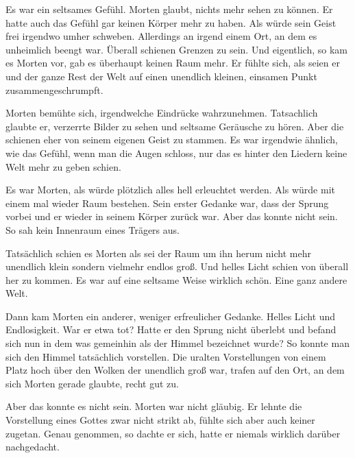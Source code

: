 Es war ein seltsames Gefühl. Morten glaubt, nichts mehr sehen zu können. Er hatte auch das Gefühl gar keinen Körper mehr zu haben. Als würde sein Geist frei irgendwo umher schweben. Allerdings an irgend einem Ort, an dem es unheimlich beengt war. Überall schienen Grenzen zu sein. Und eigentlich, so kam es Morten vor, gab es überhaupt keinen Raum mehr. Er fühlte sich, als seien er und der ganze Rest der Welt auf einen unendlich kleinen, einsamen Punkt zusammengeschrumpft.

\par

Morten bemühte sich, irgendwelche Eindrücke wahrzunehmen. Tatsachlich glaubte er, verzerrte Bilder zu sehen und seltsame Geräusche zu hören. Aber die schienen eher von seinem eigenen Geist zu stammen. Es war irgendwie ähnlich, wie das Gefühl, wenn man die Augen schloss, nur das es hinter den Liedern keine Welt mehr zu geben schien.

\par

Es war Morten, als würde plötzlich alles hell erleuchtet werden. Als würde mit einem mal wieder Raum bestehen. Sein erster Gedanke war, dass der Sprung vorbei und er wieder in seinem Körper zurück war. Aber das konnte nicht sein. So sah kein Innenraum eines Trägers aus.

\par

Tatsächlich schien es Morten als sei der Raum um ihn herum nicht mehr unendlich klein sondern vielmehr endlos groß. Und helles Licht schien von überall her zu kommen. Es war auf eine seltsame Weise wirklich schön. Eine ganz andere Welt.

\par

Dann kam Morten ein anderer, weniger erfreulicher Gedanke. Helles Licht und Endlosigkeit. War er etwa tot? Hatte er den Sprung nicht überlebt und befand sich nun in dem was gemeinhin als der Himmel bezeichnet wurde? So konnte man sich den Himmel tatsächlich vorstellen. Die uralten Vorstellungen von einem Platz hoch über den Wolken der unendlich groß war, trafen auf den Ort, an dem sich Morten gerade glaubte, recht gut zu.

\par

Aber das konnte es nicht sein. Morten war nicht gläubig. Er lehnte die Vorstellung eines Gottes zwar nicht strikt ab, fühlte sich aber auch keiner zugetan. Genau genommen, so dachte er sich, hatte er niemals wirklich darüber nachgedacht.

